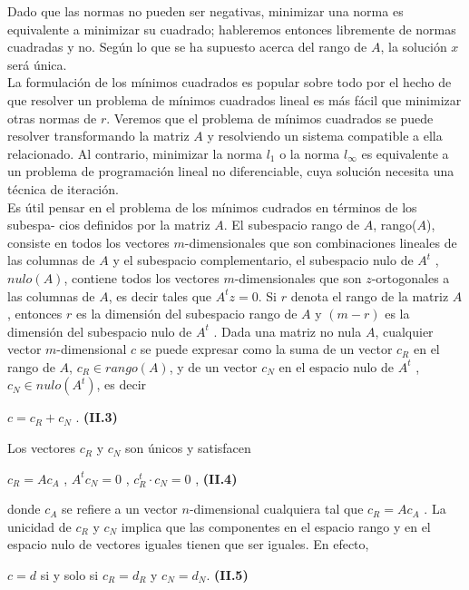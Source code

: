 \documentclass[twocolumn,twoside]{article}
\begin{document}
Dado que las normas no pueden ser negativas, minimizar una norma es equivalente a
minimizar su cuadrado; hableremos entonces libremente de normas cuadradas y no. Seg\'un
lo que se ha supuesto acerca del rango de $A$, la soluci\'on $x$ ser\'a \'unica.\\
La formulaci\'on de los m\'inimos cuadrados es popular sobre todo por el hecho de que
resolver un problema de m\'inimos cuadrados lineal es m\'as f\'acil que minimizar otras normas
de $r$. Veremos que el problema de m\'inimos cuadrados se puede resolver transformando la
matriz $A$ y resolviendo un sistema compatible a ella relacionado. Al contrario, minimizar
la norma $l_1$ o la norma $l_\infty$ es equivalente a un problema de programaci\'on lineal no
diferenciable, cuya soluci\'on necesita una t\'ecnica de iteraci\'on.\\
Es \'util pensar en el problema de los m\'inimos cudrados en t\'erminos de los subespa-
cios definidos por la matriz $A$. El subespacio rango de $A$, rango($A$), consiste en todos
los vectores $m$-dimensionales que son combinaciones lineales de las columnas de $A$ y el
subespacio complementario, el subespacio nulo de $A^t$ , $nulo(A)$, contiene todos los vectores
$m$-dimensionales que son $z$-ortogonales a las columnas de $A$, es decir tales que $A^t z = 0$.
Si $r$ denota el rango de la matriz $A$, entonces $r$ es la dimensi\'on del subespacio rango de
$A$ y $(m - r)$ es la dimensi\'on del subespacio nulo de $A^t$ .
Dada una matriz no nula $A$, cualquier vector $m$-dimensional $c$ se puede expresar
como la suma de un vector $c_R$ en el rango de $A$, $c_R \in rango(A)$, y de un vector $c_N$ en el
espacio nulo de $A^t$ , $c_N \in nulo(A^t )$, es decir
\begin{center}
  $c = c_R + c_N$ .\hspace{2.5cm} \textbf{(II.3)}
\end{center}
Los vectores $c_R$ y $c_N$ son \'unicos y satisfacen
\begin{center}
  $c_R = A c_A$ , $A^t c_N = 0$ , $c_{R}^{t} \cdot c_N = 0$ , \hspace{0.25cm} \textbf{(II.4)}
\end{center}
donde $c_A$ se refiere a un vector $n$-dimensional cualquiera tal que $c_R = A c_A$ . La unicidad
de $c_R$ y $c_N$ implica que las componentes en el espacio rango y en el espacio nulo de
vectores iguales tienen que ser iguales. En efecto,
\begin{center}
  $c = d$ si y solo si $c_R = d_R$ y $c_N = d_N$.  \textbf{(II.5)}
\end{center}
\end{document}
